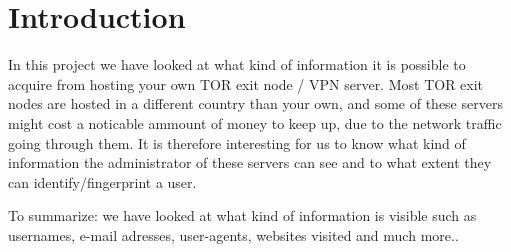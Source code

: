 \section{Introduction}
In this project we have looked at what kind of information it is possible to acquire from hosting your own TOR exit node / VPN server.
Most TOR exit nodes are hosted in a different country than your own, and some of these servers might cost a noticable ammount of money to keep up, due to the network traffic going through them. It is therefore interesting for us to know what kind of information the administrator of these servers can see and to what extent they can identify/fingerprint a user.

To summarize:
we have looked at what kind of information is visible such as usernames, e-mail adresses, user-agents, websites visited and much more..
